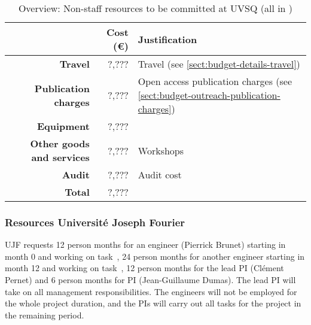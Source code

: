 \bigskip
\begin{table}[H]
\begin{tabular}{|r|r|p{9cm}|}
\hline
\textbf{} & \textbf{Cost (\euro)} & \textbf{Justification} \\\hline
\textbf{Travel} & ?,??? & Travel (see \ref{sect:budget-details-travel})\\\hline
\textbf{Publication charges} & ?,??? & Open access publication charges (see \ref{sect:budget-outreach-publication-charges})\\\hline
\textbf{Equipment} & ?,??? &  \\\hline    %

\textbf{Other goods and services} & ?,??? & Workshops \\\hline   %
\textbf{Audit} & ?,??? & Audit cost \\\hline
\textbf{Total} & ?,???\\\cline{1-2}
\end{tabular}
\caption{Overview: Non-staff resources to be committed at UVSQ (all in \texteuro)}\vspace*{-1em}
\end{table}





\subsubsection{Resources Universit\'{e} Joseph Fourier}

UJF requests 12 person months for an engineer (Pierrick Brunet) starting in
month 0 and working on task~, 24 person
months for another engineer starting in month 12 and working on task~, 12 person months for the lead PI
(Clément Pernet) and 6 person months for PI (Jean-Guillaume Dumas). 
The lead PI will take on all management responsibilities. The
engineers will not be employed for the whole project duration, and
the PIs will carry out all tasks for the project in the remaining
period.

